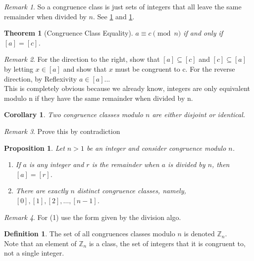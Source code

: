 \documentclass{article}
\newtheorem{theorem}{Theorem}[section]
\newtheorem{corollary}{Corollary}[section]
\newtheorem{proposition}{Proposition}[section]
\theoremstyle{definition}
\newtheorem{definition}{Definition}[section]
\theoremstyle{remark}
\newtheorem{remark}{Remark}[section]
\begin{document}
\begin{remark}
So a congruence class is just sets of integers that all leave the same remainder 
when divided by $n$. See \ref{cor:congruence_classes_disjoint} and \ref{prop:congruence class remainder and distinctness}.
\end{remark}



\begin{theorem}[Congruence Class Equality]\label{thm:congruence_class_equality}
$a \equiv c \pmod{n}$ if and only if $[a] = [c]$.

\end{theorem}
\begin{remark}
For the direction to the right, show that $[a]\subseteq [c]$ and $[c] \subseteq [a]$ by 
letting $x\in [a]$ and show that $x$ must be congruent to c.
For the reverse direction, by Reflexivity $a \in [a]$...\\
This is completely obvious because we already know, integers are only
equivalent modulo n if they have the same remainder when divided by n.
\end{remark}





\begin{corollary}\label{cor:congruence_classes_disjoint}
Two congruence classes modulo $n$ are either disjoint or identical.
\end{corollary}
\begin{remark}
Prove this by contradiction
\end{remark}



\begin{proposition}\label{prop:congruence class remainder and distinctness}
Let $n > 1$ be an integer and consider congruence modulo $n$.
\begin{enumerate}
\item If $a$ is any integer and $r$ is the remainder when $a$ is divided by $n$, then $[a] = [r]$.
\item There are exactly $n$ distinct congruence classes, namely, $[0], [1], [2], \dots, [n - 1]$.
\end{enumerate}
\end{proposition}
\begin{remark}
For (1) use the form given by the division algo. 
\end{remark}



\begin{definition}
The set of all congruences classes modulo $n$ is denoted $\mathbb{Z}_n$.\\
Note that an element of $\mathbb{Z}_n$ is a class, the set of integers that it is congruent to, not a single integer. 
\end{definition}
\end{document}
